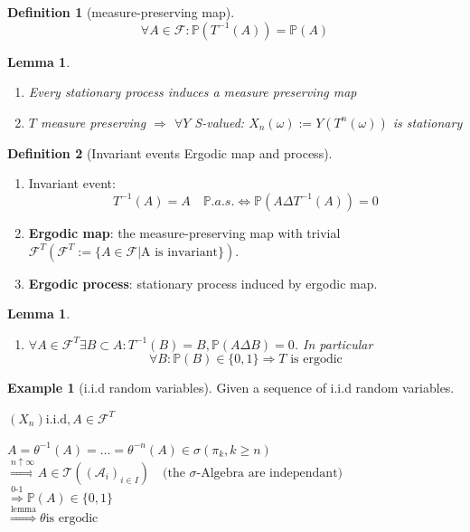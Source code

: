\documentclass[a4paper,11pt]{book}
\newtheorem{lemma}[theorem]{Lemma}
\theoremstyle{definition}
\newtheorem{definition}{Definition}[section]
\newtheorem*{example}{Example}
\theoremstyle{remark}
\begin{document}
 \begin{definition}[measure-preserving map]\quad
 \begin{equation*}
 	\forall A \in \mathcal{F}: \mathbb{P}(T^{-1}(A)) = \mathbb{P}(A) 
 \end{equation*}
 \end{definition}
 
 \begin{lemma}\quad
 \begin{enumerate}
 	\item Every stationary process induces a measure preserving map
 	\item $T$ measure preserving $\Rightarrow$ $\forall Y$ S-valued: $X_n(\omega) := Y(T^n(\omega))$ is stationary
 \end{enumerate}
 \end{lemma}
 
 \begin{definition}[Invariant events Ergodic map and process]\quad
 \begin{enumerate}
 	\item Invariant event:
 	\begin{equation*}
 		T^{-1}(A) = A \quad \mathbb{P}. a.s. \Leftrightarrow \mathbb{P}(A \Delta T^{-1}(A)) = 0
 	\end{equation*}
 	\item \textbf{Ergodic map}: the measure-preserving map with trivial $\mathcal{F}^T(\mathcal{F}^T:= \{A \in \mathcal{F}| \text{A is invariant} \})$.
 	\item \textbf{Ergodic process}: stationary process induced by ergodic map.
 \end{enumerate}
 \end{definition}
 
 \begin{lemma}\quad
 \begin{enumerate}
 	\item  $\forall A \in \mathcal{F}^T \exists B \subset A: T^{-1}(B) = B, \mathbb{P}(A \Delta B) = 0$. In particular
 	\begin{equation*}
 	\forall B: \mathbb{P}(B) \in \{0, 1\} \Rightarrow \text{$T$ is ergodic}
	\end{equation*}
 \end{enumerate}
 \end{lemma}
 
 \begin{example}[i.i.d random variables]
 Given a sequence of i.i.d random variables.\par
 $(X_n) \text{i.i.d}, A \in \mathcal{F}^T$\par
 $A = \theta^{-1}(A) = \dots = \theta^{-n}(A) \in \sigma(\pi_k, k \geq n)$\\
 $\overset{n \uparrow \infty}{\Rightarrow} A \in \mathcal{T}((\mathcal{A}_i)_{i \in I}) \quad \text{(the $\sigma$-Algebra are independant)}$\\
 $\overset{\text{0-1}}{\Rightarrow} \mathbb{P}(A) \in \{0, 1\}$\\
 $\overset{\text{lemma}}{\Rightarrow} \theta \text{is ergodic}$

 \end{example}
\end{document}
